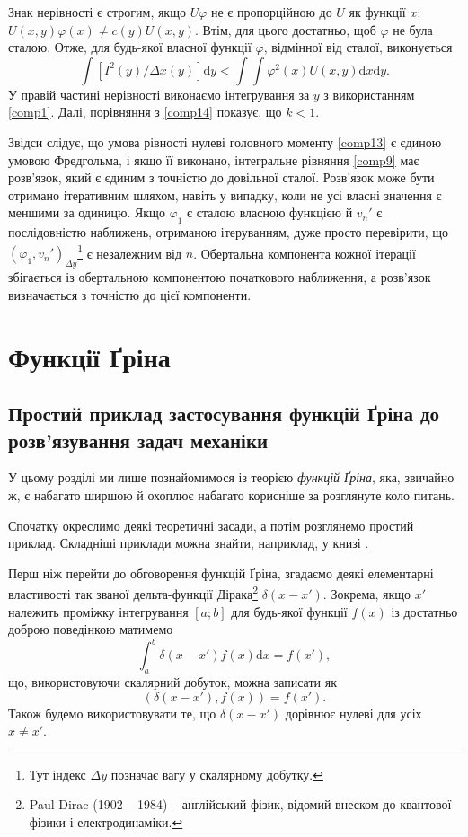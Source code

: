 \documentclass[14pt,twoside]{extreport}
\theoremstyle{mystyle}
\numberwithin{equation}{chapter}
\begin{document}
Знак нерівності є строгим, якщо $ U\varphi$ не є пропорційною до $U$ як функції $x$: $U(x, y)\varphi(x) \neq c(y)U(x, y)$. Втім, для цього достатньо, щоб $\varphi$ не була сталою. Отже, для будь-якої власної функції $\varphi$, відмінної від сталої, виконується
\begin{equation}\label{comp17}
	\displaystyle \int[I^{2}(y)/\Delta x(y)]\mathrm{d}y<\int\int\varphi^{2}(x)U(x, y)\mathrm{d}x\mathrm{d}y.
\end{equation}
У правій частині нерівності виконаємо інтегрування за $y$ з використанням \eqref{comp1}. Далі, порівняння з \eqref{comp14} показує, що $k<1$.

Звідси слідує, що умова рівності нулеві головного моменту \eqref{comp13} є єдиною умовою Фредгольма, і якщо її виконано, інтегральне рівняння \eqref{comp9} має розв'язок, який є єдиним з точністю до довільної сталої. Розв'язок може бути отримано ітеративним шляхом, навіть у випадку, коли не усі власні значення є меншими за одиницю. Якщо $\varphi_{1}$ є сталою власною функцією й $v_{n}'$ є послідовністю наближень, отриманою ітеруванням, дуже просто перевірити, що $(\varphi_{1}, v_{n}')_{\Delta y}$\footnote{Тут індекс $\Delta y$ позначає вагу у скалярному добутку.} є незалежним від $n$. Обертальна компонента кожної ітерації збігається із обертальною компонентою початкового наближення, а розв'язок визначається з точністю до цієї компоненти.

\chapter{Функції Ґріна}

\section{Простий приклад застосування функцій Ґріна до розв'язування задач механіки}

У цьому розділі ми лише познайомимося із теорією \emph{функцій Ґріна}, яка, звичайно ж, є набагато ширшою й охоплює набагато корисніше за розглянуте коло питань.

Спочатку окреслимо деякі теоретичні засади, а потім розглянемо простий приклад. Складніші приклади можна знайти, наприклад, у книзі \cite{Masujima}.

Перш ніж перейти до обговорення функцій Ґріна, згадаємо деякі елементарні властивості так званої дельта-функції Дірака\footnote{Paul Dirac (1902 -- 1984) -- англійський фізик, відомий внеском до квантової фізики і електродинаміки.} $\delta(x-x')$. Зокрема, якщо $x'$ належить проміжку інтегрування $[a; b]$ для будь-якої функції $f(x)$ із достатньо доброю поведінкою матимемо
\begin{equation}
\int_{a}^{b}\delta(x-x')f(x)\mathrm{d}x=f(x'),
\end{equation}
що, використовуючи скалярний добуток, можна записати як
\begin{equation}\label{172}
(\delta(x-x'),f(x))=f(x').
\end{equation}
Також будемо використовувати те, що $\delta(x-x')$ дорівнює нулеві для усіх $x\neq x'$.
\end{document}
